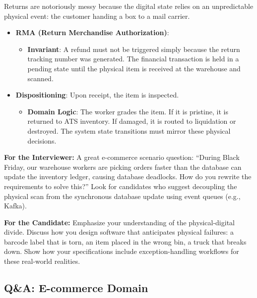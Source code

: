 \documentclass[
  11pt,
  openany,
  oneside]{book}
\providecommand{\tightlist}{%
  \setlength{\itemsep}{0pt}\setlength{\parskip}{0pt}}
\renewenvironment{quote}{\begin{customquote}}{\end{customquote}}
\begin{document}
Returns are notoriously messy because the digital state relies on an
unpredictable physical event: the customer handing a box to a mail
carrier.

\begin{itemize}
\tightlist
\item
  \textbf{RMA (Return Merchandise Authorization)}:

  \begin{itemize}
  \tightlist
  \item
    \textbf{Invariant}: A refund must not be triggered simply because
    the return tracking number was generated. The financial transaction
    is held in a pending state until the physical item is received at
    the warehouse and scanned.
  \end{itemize}
\item
  \textbf{Dispositioning}: Upon receipt, the item is inspected.

  \begin{itemize}
  \tightlist
  \item
    \textbf{Domain Logic}: The worker grades the item. If it is
    pristine, it is returned to ATS inventory. If damaged, it is routed
    to liquidation or destroyed. The system state transitions must
    mirror these physical decisions.
  \end{itemize}
\end{itemize}

\begin{quote}
\textbf{For the Interviewer:} A great e-commerce scenario question:
``During Black Friday, our warehouse workers are picking orders faster
than the database can update the inventory ledger, causing database
deadlocks. How do you rewrite the requirements to solve this?'' Look for
candidates who suggest decoupling the physical scan from the synchronous
database update using event queues (e.g., Kafka).
\end{quote}

\begin{quote}
\textbf{For the Candidate:} Emphasize your understanding of the
physical-digital divide. Discuss how you design software that
anticipates physical failures: a barcode label that is torn, an item
placed in the wrong bin, a truck that breaks down. Show how your
specifications include exception-handling workflows for these real-world
realities.
\end{quote}

\subsection{Q\&A: E-commerce Domain}\label{qa-e-commerce-domain}
\end{document}
